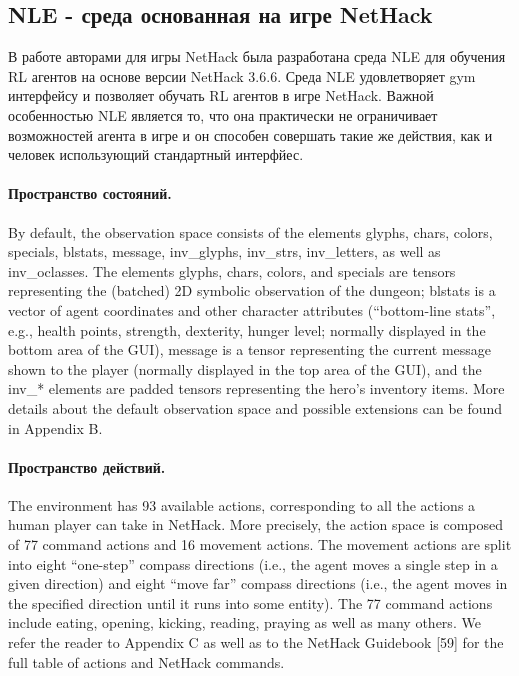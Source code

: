 \subsection{NLE - среда основанная на игре NetHack}
В работе \cite{nethack} авторами для игры NetHack была разработана среда NLE для обучения RL агентов на основе версии NetHack 3.6.6. Среда NLE удовлетворяет gym интерфейсу \cite{brockman2016openai} и позволяет обучать RL агентов в игре NetHack. Важной особенностью NLE является то, что она практически не ограничивает возможностей агента в игре и он способен совершать такие же действия, как и человек использующий стандартный интерфйес. 

\paragraph{Пространство состояний.}
By default, the observation space consists of the elements glyphs, chars, colors, specials, blstats,
message, inv\_glyphs, inv\_strs, inv\_letters, as well as inv\_oclasses. The elements glyphs, chars, colors,
and specials are tensors representing the (batched) 2D symbolic observation of the dungeon; blstats
is a vector of agent coordinates and other character attributes (“bottom-line stats”, e.g., health points,
strength, dexterity, hunger level; normally displayed in the bottom area of the GUI), message is a
tensor representing the current message shown to the player (normally displayed in the top area of
the GUI), and the inv\_* elements are padded tensors representing the hero’s inventory items. More
details about the default observation space and possible extensions can be found in Appendix B.

\paragraph{Пространство действий.} The environment has 93 available actions, corresponding to all the actions a human player can take in
NetHack. More precisely, the action space is composed of 77 command actions and 16 movement
actions. The movement actions are split into eight “one-step” compass directions (i.e., the agent
moves a single step in a given direction) and eight “move far” compass directions (i.e., the agent
moves in the specified direction until it runs into some entity). The 77 command actions include
eating, opening, kicking, reading, praying as well as many others. We refer the reader to Appendix C
as well as to the NetHack Guidebook [59] for the full table of actions and NetHack commands.


